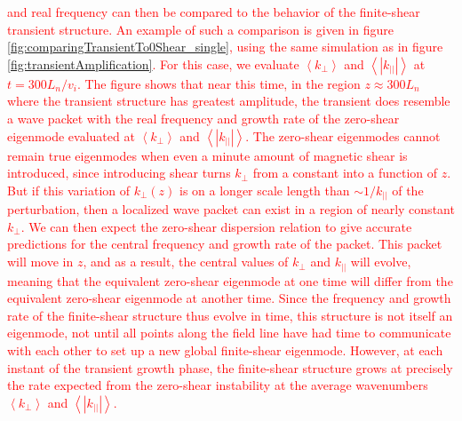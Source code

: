 \documentclass[12pt,superscriptaddress]{revtex4}
\newcommand{\changed}[1]{\textcolor{red}{#1}}
\begin{document}
\changed{
and real frequency can then be compared to the behavior of the finite-shear
transient structure.
An example of such a comparison is given in figure \ref{fig:comparingTransientTo0Shear_single},
using the same simulation as in figure \ref{fig:transientAmplification}.
For this case, we evaluate $\left< k_{\perp}\right>$ and $\left<|k_{||}|\right>$
at $t = 300 L_n/v_i$.
The figure shows that near this time, in the region $z \approx 300 L_n$ where the transient structure has greatest
amplitude, the transient does resemble a wave packet with the real frequency and growth rate
of the zero-shear eigenmode evaluated at $\left< k_{\perp}\right>$ and $\left<|k_{||}|\right>$.
The zero-shear eigenmodes cannot remain true eigenmodes when even a minute amount of magnetic shear
is introduced, since introducing shear turns $k_{\perp}$ from a constant into a function of $z$.
But if this variation of $k_{\perp}(z)$ is on a longer scale length than $\sim 1/k_{||}$ of the perturbation, 
then a localized wave packet can exist in a region of nearly constant $k_{\perp}$.
We can then expect the zero-shear dispersion relation to give accurate predictions for the central frequency
and growth rate of the packet. This packet will move in $z$, and as a result, the central values of $k_{\perp}$
and $k_{||}$ will evolve, meaning that the equivalent zero-shear eigenmode at one time
will differ from the equivalent zero-shear eigenmode at another time. 
Since the frequency and growth rate of the finite-shear structure thus evolve in time, this structure is not
itself an eigenmode, not until all points along the field line have had time to communicate with each other
to set up a new global finite-shear eigenmode.
However, at each instant of the transient growth phase, the finite-shear structure grows at precisely the rate expected from the zero-shear
instability at the average wavenumbers $\left< k_{\perp} \right>$ and $\left< \left| k_{||} \right| \right>$.
}
\end{document}
